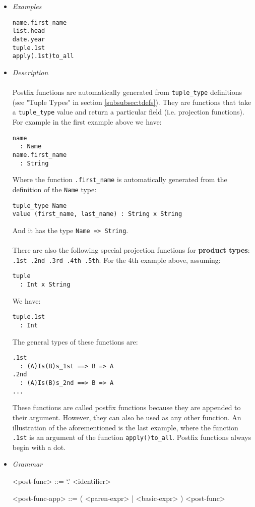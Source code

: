\documentclass{article}
\begin{document}
\begin{itemize}

\item \textit{Examples}
\begin{verbatim}
name.first_name
list.head
date.year
tuple.1st
apply(.1st)to_all
\end{verbatim}

\item \textit{Description} \\\\
Postfix functions are automatically generated from \texttt{tuple_type}
definitions (see "Tuple Types" in section \ref{subsubsec:tdefs}). They are
functions that take a \texttt{tuple_type} value and return a particular field
(i.e. projection functions). For example in the first example above we have:
\begin{verbatim}
name 
  : Name
name.first_name
  : String
\end{verbatim}
Where the function \texttt{.first_name} is automatically generated from the
definition of the \texttt{Name} type:
\begin{verbatim}
tuple_type Name
value (first_name, last_name) : String x String
\end{verbatim}
And it has the type \texttt{Name => String}.
\\\\
There are also the following special projection functions for \textbf{product
types}: \texttt{.1st .2nd .3rd .4th .5th}. For the 4th example above, assuming:
\begin{verbatim}
tuple 
  : Int x String
\end{verbatim}
We have:
\begin{verbatim}
tuple.1st
  : Int
\end{verbatim}
The general types of these functions are:
\begin{verbatim}
.1st
  : (A)Is(B)s_1st ==> B => A
.2nd
  : (A)Is(B)s_2nd ==> B => A
...
\end{verbatim}
These functions are called postfix functions because they are appended to
their argument. However, they can also be used as any other function.
An illustration of the aforementioned is the last example, where the function
\texttt{.1st} is an argument of the function \texttt{apply()to_all}.
Postfix functions always begin with a dot.


\item \textit{Grammar}
\begin{grammar}
<post-func> ::= `.' <identifier>

<post-func-app> ::= ( <paren-expr> | <basic-expr> ) <post-func>
\end{grammar}

\end{itemize}
\end{document}
